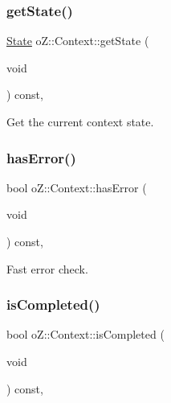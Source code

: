 \subsubsection{\texorpdfstring{getState()}{getState()}}
{\footnotesize\ttfamily \mbox{\hyperlink{namespaceo_z_a356b278f7c65def0cae75fca8cae268e}{State}} o\+Z\+::\+Context\+::get\+State (\begin{DoxyParamCaption}\item[{void}]{ }\end{DoxyParamCaption}) const\hspace{0.3cm}{\ttfamily [inline]}, {\ttfamily [noexcept]}}



Get the current context\textquotesingle{} state. 

\mbox{\label{classo_z_1_1_context_a53afdf1400b5ec8429b09da40662a34d}} 
\subsubsection{\texorpdfstring{hasError()}{hasError()}}
{\footnotesize\ttfamily bool o\+Z\+::\+Context\+::has\+Error (\begin{DoxyParamCaption}\item[{void}]{ }\end{DoxyParamCaption}) const\hspace{0.3cm}{\ttfamily [inline]}, {\ttfamily [noexcept]}}



Fast error check. 

\mbox{\label{classo_z_1_1_context_ac5dd957a1f76f466b86a179ed3146967}} 
\subsubsection{\texorpdfstring{isCompleted()}{isCompleted()}}
{\footnotesize\ttfamily bool o\+Z\+::\+Context\+::is\+Completed (\begin{DoxyParamCaption}\item[{void}]{ }\end{DoxyParamCaption}) const\hspace{0.3cm}{\ttfamily [inline]}, {\ttfamily [noexcept]}}



